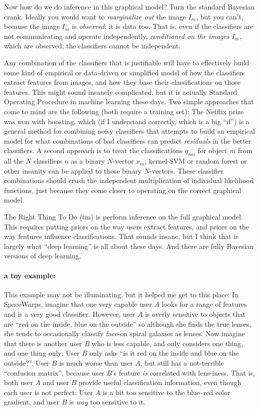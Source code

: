 \documentclass[12pt]{article}
\begin{document}
Now how do we do inference in this graphical model?
Turn the standard Bayesian crank.
Ideally you would want to \emph{marginalize out} the image $I_m$, but you can't,
  because the image $I_m$ is \emph{observed};
  it is data too.
That is, even if the classifiers are not communicating and operate independently,
  \emph{conditioned on the images $I_m$}, which are observed, the classifiers cannot be independent.

Any combination of the classifiers that is justifiable will have to
  effectively build some kind of empirical or data-driven or simplified model
  of how the classifiers extract features from images,
  and how they base their classifications on those features.
This might sound insanely complicated,
  but it is actually Standard Operating Procedure in machine learning these days.
Two simple approaches that come to mind are the following (both require a training set):
The Netflix prize was won with boosting,
  which (if I understand correctly, which is a big ``if'')
  is a general method for combining noisy classifiers
  that attempts to build an empirical model
  for what combinations of bad classifiers can predict \emph{residuals} in the better classifiers.
A second approach is to treat
  the classifications $q_{nm}$ for object $m$ from all the $N$ classifiers $n$ as a binary $N$-vector $x_m$;
  kernel-SVM or random forest or other insanity can be applied to those binary $N$-vectors.
These classifier combinations should crush the independent multiplication of individual likelihood functions,
  just because they come closer to operating on the correct graphical model.

The Right Thing To Do (tm) is perform inference on the full graphical model.
This requires putting priors on the way users extract features,
  and priors on the way features influence classifications.
That sounds insane, but I think that is largely what ``deep learning'' is all about these days.
And there are fully Bayesian versions of deep learning.

\paragraph{a toy example:}
This example may not be illuminating, but it helped me get to this place:
In SpaceWarps,
  imagine that one very capable user $A$ looks for a range of features and is a very good classifier.
However, user $A$ is overly sensitive to objects that are ``red on the inside, blue on the outside''
  so although she finds the true lenses,
  she tends to occasionally classify face-on spiral galaxies as lenses.
Now imagine that there is another user $B$ who is less capable, and only considers one thing, and one thing only:
User $B$ only asks ``is it red on the inside and blue on the outside?''.
User $B$ is much worse than user $A$, but still has a not-terrible ``confusion matrix'',
  because user $B$'s feature \emph{is} correlated with lens-iness.
That is, both user $A$ and user $B$ provide useful classification information,
  even though each user is not perfect:
User $A$ is a bit too sensitive to the blue--red color gradient, and user $B$ is \emph{way} too sensitive to it.
\end{document}

